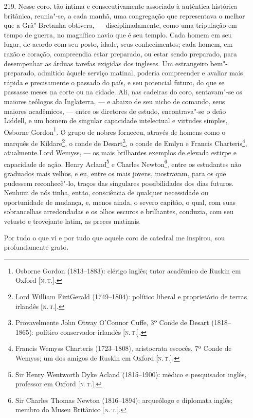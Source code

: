 219. Nesse coro, tão íntima e consecutivamente associado à autêntica
histórica britânica, reunia"-se, a cada manhã, uma congregação que
representava o melhor que a Grã"-Bretanha obtivera, --- disciplinadamente,
como uma tripulação em tempo de guerra, no magnífico navio que é seu
templo. Cada homem em seu lugar, de acordo com seu posto, idade, seus
conhecimentos; cada homem, em razão e coração, compreendia estar
preparado, ou estar sendo preparado, para desempenhar as árduas tarefas
exigidas dos ingleses. Um estrangeiro bem"-preparado, admitido àquele
serviço matinal, poderia compreender e avaliar mais rápida e
precisamente o passado do país, e seu potencial futuro, do que se
passasse meses na corte ou na cidade. Ali, nas cadeiras do coro,
sentavam"-se os maiores teólogos da Inglaterra, --- e abaixo de seu nicho
de comando, seus maiores acadêmicos, --- entre os diretores de estudo,
encontrava"-se o deão Liddell, e um homem de singular capacidade
intelectual e virtudes simples, Osborne Gordon\footnote{Osborne Gordon
  (1813--1883): clérigo inglês; tutor acadêmico de Ruskin em Oxford {[}\textsc{n.\,t.}{]}.}. O grupo de nobres forneceu, através de homens como o
marquês de Kildare\footnote{Lord William FiztGerald (1749--1804):
  político liberal e proprietário de terras irlandês {[}\textsc{n.\,t.}{]}.}, o
conde de Desart\footnote{Provavelmente John Otway O'Connor Cuffe, 3º
  Conde de Desart (1818--1865): político conservador irlandês {[}\textsc{n.\,t.}{]}.}, o conde de Emlyn e Francis Charteris\footnote{Francis Wemyss
  Charteris (1723--1808), aristocrata escocês, 7º Conde de Wemyss; um dos
  amigos de Ruskin em Oxford {[}\textsc{n.\,t.}{]}.}, atualmente Lord Wemyss,
--- os mais brilhantes exemplos de elevada estirpe e capacidade de ação.
Henry Acland\footnote{Sir Henry Wentworth Dyke Acland (1815--1900):
  médico e pesquisador inglês, professor em Oxford {[}\textsc{n.\,t.}{]}.} e
Charles Newton\footnote{Sir Charles Thomas Newton (1816--1894):
  arqueólogo e diplomata inglês; membro do Museu Britânico {[}\textsc{n.\,t.}{]}.}, entre os estudantes não graduados mais velhos, e eu, entre os
mais jovens, mostravam, para os que pudessem reconhecê"-lo, traços das
singulares possibilidades dos dias futuros. Nenhum de nós tinha, então,
consciência de qualquer necessidade ou oportunidade de mudança, e, menos
ainda, o severo capitão, o qual, com suas sobrancelhas arredondadas e os
olhos escuros e brilhantes, conduzia, com seu vetusto e trovejante
latim, as preces matinais.

Por tudo o que vi e por tudo que aquele coro de catedral me inspirou,
sou profundamente grato.

